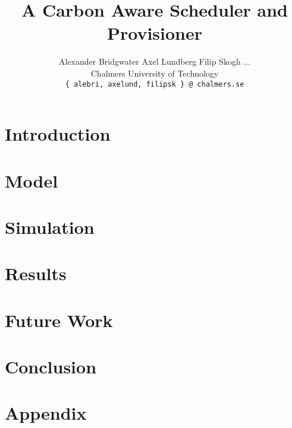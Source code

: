 \documentclass[a4paper, twocolumn]{article}
\title{A Carbon Aware Scheduler and Provisioner}
\author{Alexander Bridgwater\textsuperscript{\textdagger} \quad
    Axel Lundberg\textsuperscript{\textdagger} \quad
    Filip Skogh\textsuperscript{\textdagger} \quad ...\\
    \textdagger Chalmers University of Technology \\
    \small\texttt{\{ alebri, axelund, filipsk \} @ chalmers.se}
    }
\date{}
\begin{document}

\maketitle

%


\section{Introduction}



\section{Model}


\section{Simulation}


\section{Results}


\section{Future Work}


\section{Conclusion}


\newpage

\section{Appendix}






\newpage

%
\end{document}
